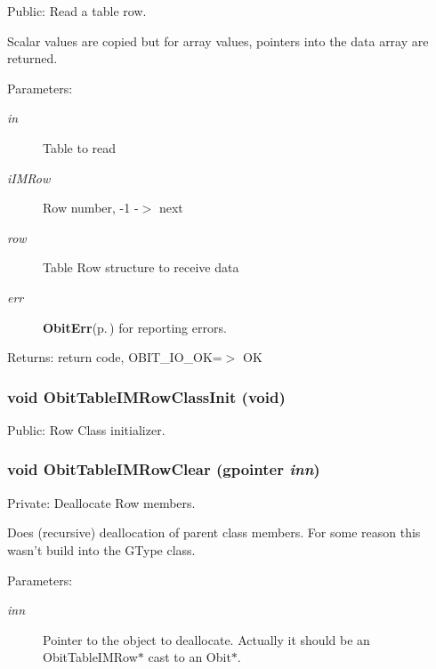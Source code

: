 Public: Read a table row. 

Scalar values are copied but for array values, pointers into the data array are returned. \begin{Desc}
\item[Parameters:]
\begin{description}
\item[{\em in}]Table to read \item[{\em i\-IMRow}]Row number, -1 -$>$ next \item[{\em row}]Table Row structure to receive data \item[{\em err}]{\bf Obit\-Err}{\rm (p.\,\pageref{structObitErr})} for reporting errors. \end{description}
\end{Desc}
\begin{Desc}
\item[Returns:]return code, OBIT\_\-IO\_\-OK=$>$ OK \end{Desc}
\subsubsection{\setlength{\rightskip}{0pt plus 5cm}void Obit\-Table\-IMRow\-Class\-Init (void)}\label{ObitTableIM_8c_a26}


Public: Row Class initializer. 

\subsubsection{\setlength{\rightskip}{0pt plus 5cm}void Obit\-Table\-IMRow\-Clear (gpointer {\em inn})}\label{ObitTableIM_8c_a7}


Private: Deallocate Row members. 

Does (recursive) deallocation of parent class members. For some reason this wasn't build into the GType class. \begin{Desc}
\item[Parameters:]
\begin{description}
\item[{\em inn}]Pointer to the object to deallocate. Actually it should be an Obit\-Table\-IMRow$\ast$ cast to an Obit$\ast$. \end{description}
\end{Desc}
